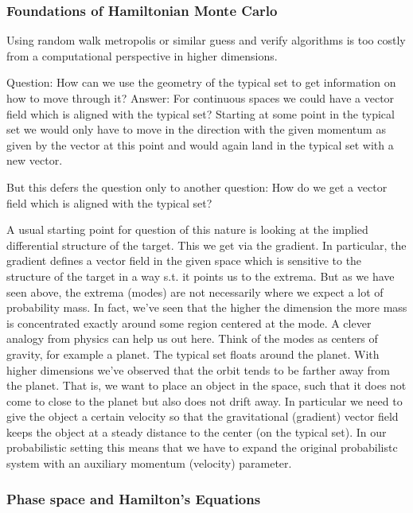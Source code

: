 \subsubsection{Foundations of Hamiltonian Monte Carlo}
Using random walk metropolis or similar guess and verify algorithms is too costly
from a computational perspective in higher dimensions.

Question: How can we use the geometry of the typical set to get information
on how to move through it?
Answer: For continuous spaces we could have a vector field which is aligned with the typical set?
Starting at some point in the typical set we would only have to move in the direction with
the given momentum as given by the vector at this point and would again land in the typical set with a new vector.

But this defers the question only to another question: How do we get a vector field
which is aligned with the typical set?

A usual starting point for question of this nature is looking at the implied differential structure of the target.
This we get via the gradient. In particular, the gradient defines a vector field in the given space which is
sensitive to the structure of the target in a way s.t. it points us to the extrema.
But as we have seen above, the extrema (modes) are not necessarily where we expect
a lot of probability mass. In fact, we've seen that the higher the dimension the more
mass is concentrated exactly around some region centered at the mode.
A clever analogy from physics can help us out here. Think of the modes as centers of gravity, for example a planet.
The typical set floats around the planet. With higher dimensions we've observed that
the orbit tends to be farther away from the planet. That is, we want to place an object
in the space, such that it does not come to close to the planet but also does not drift away.
In particular we need to give the object a certain velocity so that the gravitational (gradient)
vector field keeps the object at a steady distance to the center (on the typical set).
In our probabilistic setting this means that we have to expand the original probabilistc system with
an auxiliary momentum (velocity) parameter.

\subsubsection*{Phase space and Hamilton's Equations}




